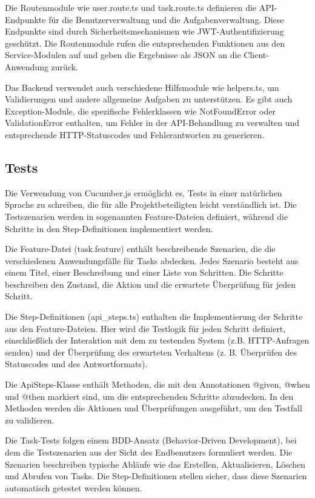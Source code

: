 \documentclass[a4paper, 12pt]{article}
\begin{document}
    Die Routenmodule wie user.route.ts und task.route.ts definieren die API-Endpunkte für die Benutzerverwaltung und die
    Aufgabenverwaltung. Diese Endpunkte sind durch Sicherheitsmechanismen wie JWT-Authentifizierung geschützt. Die
    Routenmodule rufen die entsprechenden Funktionen aus den Service-Modulen auf und geben die Ergebnisse als JSON an die
    Client-Anwendung zurück.

    Das Backend verwendet auch verschiedene Hilfsmodule wie helpers.ts, um Validierungen und andere allgemeine Aufgaben zu
    unterstützen. Es gibt auch Exception-Module, die spezifische Fehlerklassen wie NotFoundError oder ValidationError
    enthalten, um Fehler in der API-Behandlung zu verwalten und entsprechende HTTP-Statuscodes und Fehlerantworten zu
    generieren.

    \subsection{Tests}

    Die Verwendung von Cucumber.js ermöglicht es, Tests in einer natürlichen Sprache zu schreiben, die für alle Projektbeteiligten leicht
    verständlich ist. Die Testszenarien werden in sogenannten Feature-Dateien definiert, während die Schritte in den Step-Definitionen
    implementiert werden.

    Die Feature-Datei (task.feature) enthält beschreibende Szenarien, die die verschiedenen Anwendungsfälle für Tasks abdecken. Jedes Szenario
    besteht aus einem Titel, einer Beschreibung und einer Liste von Schritten. Die Schritte beschreiben
    den Zustand, die Aktion und die erwartete Überprüfung für jeden Schritt.

    Die Step-Definitionen (api_steps.ts) enthalten die Implementierung der Schritte aus den Feature-Dateien. Hier wird die Testlogik für jeden
    Schritt definiert, einschließlich der Interaktion mit dem zu testenden System (z.B. HTTP-Anfragen senden) und der Überprüfung des erwarteten
    Verhaltens (z. B. Überprüfen des Statuscodes und des Antwortformats).

    Die ApiSteps-Klasse enthält Methoden, die mit den Annotationen @given, @when und @then markiert sind, um die entsprechenden Schritte
    abzudecken. In den Methoden werden die Aktionen und Überprüfungen ausgeführt, um den Testfall zu validieren.

    Die Task-Tests folgen einem BDD-Ansatz (Behavior-Driven Development), bei dem die Testszenarien aus der Sicht des Endbenutzers formuliert
    werden. Die Szenarien beschreiben typische Abläufe wie das Erstellen, Aktualisieren, Löschen und Abrufen von Tasks. Die Step-Definitionen
    stellen sicher, dass diese Szenarien automatisch getestet werden können.
\end{document}
